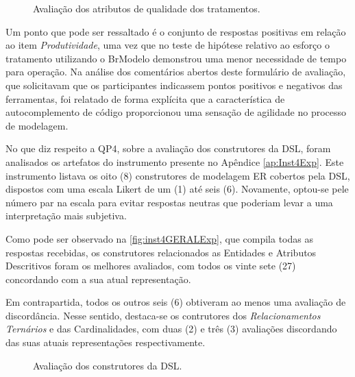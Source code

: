\begin{figure}[!htb]
    \centering
    \caption{Avaliação dos atributos de qualidade dos tratamentos.}
    \label{fig:inst3GERALExp}
    
\end{figure}


Um ponto que pode ser ressaltado é o conjunto de respostas positivas em relação ao item \textit{Produtividade}, uma vez que no teste de hipótese relativo ao esforço o tratamento utilizando o BrModelo demonstrou uma menor necessidade de tempo para operação.
Na análise dos comentários abertos deste formulário de avaliação, que solicitavam que os participantes indicassem pontos positivos e negativos das ferramentas, foi relatado de forma explícita que a característica de autocomplemento de código proporcionou uma sensação de agilidade no processo de modelagem.

No que diz respeito a \ac{QP}4, sobre a avaliação dos construtores da \ac{DSL}, foram analisados os artefatos do instrumento presente no Apêndice \ref{ap:Inst4Exp}.
Este instrumento listava os oito (8) construtores de modelagem \ac{ER} cobertos pela \ac{DSL}, dispostos com uma escala Likert de um (1) até seis (6).
Novamente, optou-se pele número par na escala para evitar respostas neutras que poderiam levar a uma interpretação mais subjetiva.

Como pode ser observado na \autoref{fig:inst4GERALExp}, que compila todas as respostas recebidas, os construtores relacionados as Entidades e Atributos Descritivos foram os melhores avaliados, com todos os vinte sete (27) concordando com a sua atual representação.

Em contrapartida, todos os outros seis (6) obtiveram ao menos uma avaliação de discordância. 
Nesse sentido, destaca-se os contrutores dos \textit{Relacionamentos Ternários} e das Cardinalidades, com duas (2) e três (3) avaliações discordando das suas atuais representações respectivamente.

\begin{figure}[!htb]
    \centering
    \caption{Avaliação dos construtores da DSL.}
    \label{fig:inst4GERALExp}
    
\end{figure}

